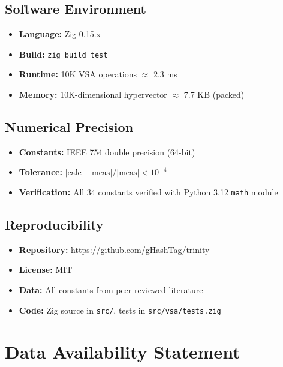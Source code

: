 \documentclass[aps,prd,preprint,superscriptaddress,showpacs,nofootinbib,longbibliography]{revtex4-2}
\begin{document}
\subsection{Software Environment}

\begin{itemize}
    \item \textbf{Language:} Zig 0.15.x
    \item \textbf{Build:} \texttt{zig build test}
    \item \textbf{Runtime:} 10K VSA operations $\approx$ 2.3 ms
    \item \textbf{Memory:} 10K-dimensional hypervector $\approx$ 7.7 KB (packed)
\end{itemize}

\subsection{Numerical Precision}

\begin{itemize}
    \item \textbf{Constants:} IEEE 754 double precision (64-bit)
    \item \textbf{Tolerance:} $|\text{calc} - \text{meas}| / |\text{meas}| < 10^{-4}$
    \item \textbf{Verification:} All 34 constants verified with Python 3.12 \texttt{math} module
\end{itemize}

\subsection{Reproducibility}

\begin{itemize}
    \item \textbf{Repository:} \url{https://github.com/gHashTag/trinity}
    \item \textbf{License:} MIT
    \item \textbf{Data:} All constants from peer-reviewed literature
    \item \textbf{Code:} Zig source in \texttt{src/}, tests in \texttt{src/vsa/tests.zig}
\end{itemize}

\section{Data Availability Statement}
\label{app:data}
\end{document}
